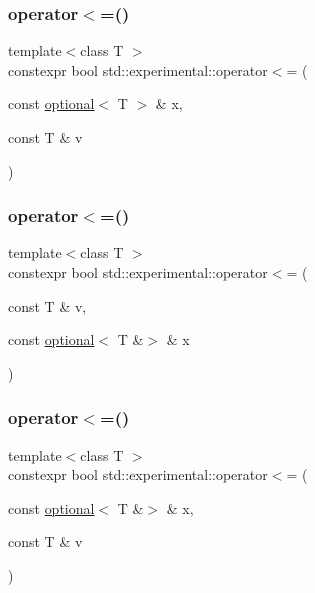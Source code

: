\mbox{\label{namespacestd_1_1experimental_a9dd11e02b37f5d3e9c09a29c7ea7024c}} 
\subsubsection{\texorpdfstring{operator$<$=()}{operator<=()}\hspace{0.1cm}{\footnotesize\ttfamily [5/9]}}
{\footnotesize\ttfamily template$<$class T $>$ \\
constexpr bool std\+::experimental\+::operator$<$= (\begin{DoxyParamCaption}\item[{const \mbox{\hyperlink{classstd_1_1experimental_1_1optional}{optional}}$<$ T $>$ \&}]{x,  }\item[{const T \&}]{v }\end{DoxyParamCaption})}

\mbox{\label{namespacestd_1_1experimental_a59ad44110fa8b750e2ca4cf69327c182}} 
\subsubsection{\texorpdfstring{operator$<$=()}{operator<=()}\hspace{0.1cm}{\footnotesize\ttfamily [6/9]}}
{\footnotesize\ttfamily template$<$class T $>$ \\
constexpr bool std\+::experimental\+::operator$<$= (\begin{DoxyParamCaption}\item[{const T \&}]{v,  }\item[{const \mbox{\hyperlink{classstd_1_1experimental_1_1optional}{optional}}$<$ T \&$>$ \&}]{x }\end{DoxyParamCaption})}

\mbox{\label{namespacestd_1_1experimental_adeee1539a6ebda9088aaaa92a363a38c}} 
\subsubsection{\texorpdfstring{operator$<$=()}{operator<=()}\hspace{0.1cm}{\footnotesize\ttfamily [7/9]}}
{\footnotesize\ttfamily template$<$class T $>$ \\
constexpr bool std\+::experimental\+::operator$<$= (\begin{DoxyParamCaption}\item[{const \mbox{\hyperlink{classstd_1_1experimental_1_1optional}{optional}}$<$ T \&$>$ \&}]{x,  }\item[{const T \&}]{v }\end{DoxyParamCaption})}

